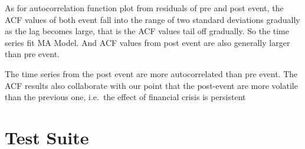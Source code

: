 \documentclass[letterpaper,10pt,english]{/Users/edwsurewin/anaconda/lib/python2.7/site-packages/sphinx/texinputs/sphinxhowto}
\begin{document}
As for autocorrelation function plot from residuals of pre and post
event, the ACF values of both event fall into the range of two standard
deviations gradually as the lag becomes large, that is the ACF values
tail off gradually. So the time series fit MA Model. And ACF values from
post event are also generally larger than pre event.

The time series from the post event are more autocorrelated than pre
event. The ACF results also collaborate with our point that the
post-event are more volatile than the previous one, i.e.~the effect of
financial crisis is persistent\section{Test Suite}\label{test-suite}

\end{document}
